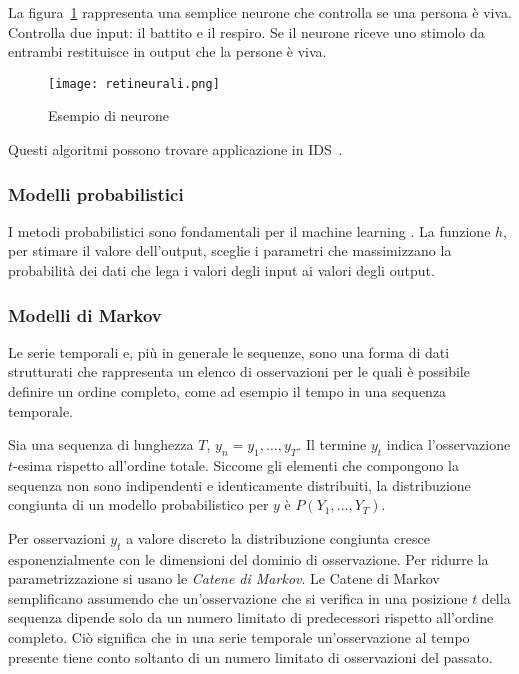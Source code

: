 \documentclass[../main.tex]{subfiles}
\begin{document}
La figura~\ref{fig:retineurali} rappresenta una semplice neurone che controlla se una persona è viva. Controlla due input: il battito e il respiro. Se il neurone riceve uno stimolo da entrambi restituisce in output che la persone è viva.

\begin{figure}[H]
				\centering
				\texttt{[image: retineurali.png]}
				\caption{Esempio di neurone}
				\label{fig:retineurali}
\end{figure}

Questi algoritmi possono trovare applicazione in IDS~\cite{reteneuraleids}.

\subsubsection{Modelli probabilistici}
I metodi probabilistici sono fondamentali per il machine learning \cite{compIntelligence}. La funzione $h$, per stimare il valore dell'output, sceglie i parametri che massimizzano la probabilità dei dati che lega i valori degli input ai valori degli output.

\subsubsection{Modelli di Markov}
Le serie temporali e, più in generale le sequenze, sono una forma di dati strutturati che rappresenta un elenco di osservazioni per le quali è possibile definire un ordine completo, come ad esempio il tempo in una sequenza temporale.

Sia una sequenza di lunghezza $T$, $ { y } _ { n } = y _ { 1 } , \dots , y _ { T }$. Il termine ${y} _ {t}$ indica l'osservazione $t$-esima rispetto all'ordine totale. Siccome gli elementi che compongono la sequenza non sono indipendenti e identicamente distribuiti, la distribuzione congiunta di un modello probabilistico per $y$ è $P \left( Y _ { 1 } , \ldots , Y _ { T } \right)$.

Per osservazioni ${y} _ {t}$ a valore discreto la distribuzione congiunta cresce esponenzialmente con le dimensioni del dominio di osservazione. Per ridurre la parametrizzazione si usano le \textit{Catene di Markov}. Le Catene di Markov semplificano assumendo che un'osservazione che si verifica in una posizione $t$ della sequenza dipende solo da un numero limitato di predecessori rispetto all'ordine completo.
Ciò significa che in una serie temporale un'osservazione al tempo presente tiene conto soltanto di un numero limitato di osservazioni del passato.
\end{document}
